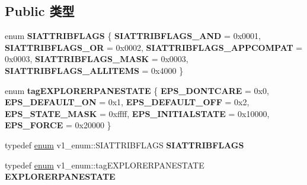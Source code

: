 \subsection*{Public 类型}
\begin{DoxyCompactItemize}
\item 
\mbox{\label{interfacev1__enum_ab23a811b5dabda6be6302e2b39c58c9c}} 
enum {\bfseries S\+I\+A\+T\+T\+R\+I\+B\+F\+L\+A\+GS} \{ \newline
{\bfseries S\+I\+A\+T\+T\+R\+I\+B\+F\+L\+A\+G\+S\+\_\+\+A\+ND} = 0x0001, 
{\bfseries S\+I\+A\+T\+T\+R\+I\+B\+F\+L\+A\+G\+S\+\_\+\+OR} = 0x0002, 
{\bfseries S\+I\+A\+T\+T\+R\+I\+B\+F\+L\+A\+G\+S\+\_\+\+A\+P\+P\+C\+O\+M\+P\+AT} = 0x0003, 
{\bfseries S\+I\+A\+T\+T\+R\+I\+B\+F\+L\+A\+G\+S\+\_\+\+M\+A\+SK} = 0x0003, 
\newline
{\bfseries S\+I\+A\+T\+T\+R\+I\+B\+F\+L\+A\+G\+S\+\_\+\+A\+L\+L\+I\+T\+E\+MS} = 0x4000
 \}
\item 
\mbox{\label{interfacev1__enum_ab93f506b1e53ed716a1ef5c856e85e0c}} 
enum {\bfseries tag\+E\+X\+P\+L\+O\+R\+E\+R\+P\+A\+N\+E\+S\+T\+A\+TE} \{ \newline
{\bfseries E\+P\+S\+\_\+\+D\+O\+N\+T\+C\+A\+RE} = 0x0, 
{\bfseries E\+P\+S\+\_\+\+D\+E\+F\+A\+U\+L\+T\+\_\+\+ON} = 0x1, 
{\bfseries E\+P\+S\+\_\+\+D\+E\+F\+A\+U\+L\+T\+\_\+\+O\+FF} = 0x2, 
{\bfseries E\+P\+S\+\_\+\+S\+T\+A\+T\+E\+\_\+\+M\+A\+SK} = 0xffff, 
\newline
{\bfseries E\+P\+S\+\_\+\+I\+N\+I\+T\+I\+A\+L\+S\+T\+A\+TE} = 0x10000, 
{\bfseries E\+P\+S\+\_\+\+F\+O\+R\+CE} = 0x20000
 \}
\item 
\mbox{\label{interfacev1__enum_abdf91fcf9f2e10c202659f17776a15ed}} 
typedef \hyperlink{interfaceenum}{enum} v1\+\_\+enum\+::\+S\+I\+A\+T\+T\+R\+I\+B\+F\+L\+A\+GS {\bfseries S\+I\+A\+T\+T\+R\+I\+B\+F\+L\+A\+GS}
\item 
\mbox{\label{interfacev1__enum_a15d9ad5c24b83240738f262578950cc6}} 
typedef \hyperlink{interfaceenum}{enum} v1\+\_\+enum\+::tag\+E\+X\+P\+L\+O\+R\+E\+R\+P\+A\+N\+E\+S\+T\+A\+TE {\bfseries E\+X\+P\+L\+O\+R\+E\+R\+P\+A\+N\+E\+S\+T\+A\+TE}
\end{DoxyCompactItemize}

